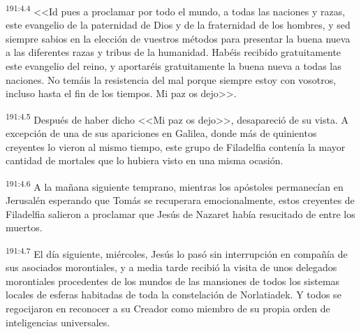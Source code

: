 \par 
\textsuperscript{191:4.4} <<Id pues a proclamar por todo el mundo, a todas las naciones y razas, este evangelio de la paternidad de Dios y de la fraternidad de los hombres, y sed siempre sabios en la elección de vuestros métodos para presentar la buena nueva a las diferentes razas y tribus de la humanidad. Habéis recibido gratuitamente este evangelio del reino, y aportaréis gratuitamente la buena nueva a todas las naciones. No temáis la resistencia del mal porque siempre estoy con vosotros, incluso hasta el fin de los tiempos. Mi paz os dejo>>.

\par 
\textsuperscript{191:4.5} Después de haber dicho <<Mi paz os dejo>>, desapareció de su vista. A excepción de una de sus apariciones en Galilea, donde más de quinientos creyentes lo vieron al mismo tiempo, este grupo de Filadelfia contenía la mayor cantidad de mortales que lo hubiera visto en una misma ocasión.

\par 
\textsuperscript{191:4.6} A la mañana siguiente temprano, mientras los apóstoles permanecían en Jerusalén esperando que Tomás se recuperara emocionalmente, estos creyentes de Filadelfia salieron a proclamar que Jesús de Nazaret había resucitado de entre los muertos.

\par 
\textsuperscript{191:4.7} El día siguiente, miércoles, Jesús lo pasó sin interrupción en compañía de sus asociados morontiales, y a media tarde recibió la visita de unos delegados morontiales procedentes de los mundos de las mansiones de todos los sistemas locales de esferas habitadas de toda la constelación de Norlatiadek. Y todos se regocijaron en reconocer a su Creador como miembro de su propia orden de inteligencias universales.


